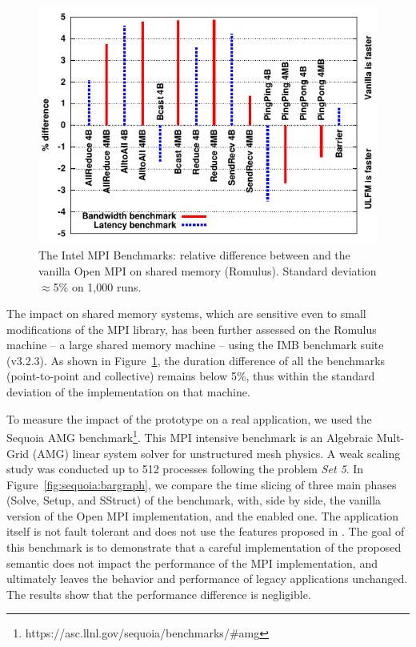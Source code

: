 \begin{figure}[ht]
\begin{center}%
 \includegraphics[width=.7\linewidth]{figures/IMB.pdf}%
 \caption{The Intel MPI Benchmarks: relative difference
   between \ulfm and the vanilla Open MPI on shared memory
  (Romulus). Standard deviation $\approx$5\% on 1,000 runs.\label{fig:IMB}}%
\end{center}
\end{figure}

The impact on shared memory systems, which are sensitive even to small
modifications of the MPI library, has been further assessed on the
Romulus machine -- a large shared memory machine -- using the IMB
benchmark suite (v3.2.3). As shown in Figure~\ref{fig:IMB}, the duration
difference of all the benchmarks (point-to-point and collective) remains
below 5\%, thus within the standard deviation of the implementation on
that machine.

To measure the impact of the prototype on a real application, we used the
Sequoia AMG benchmark\footnote{https://asc.llnl.gov/sequoia/benchmarks/\#amg}.
This MPI intensive benchmark is an Algebraic Mult-Grid (AMG) linear system
solver for unstructured mesh physics. A weak scaling study was conducted up to
512 processes following the problem \emph{Set 5}. In
Figure~\ref{fig:sequoia:bargraph}, we compare the time slicing of three main
phases (Solve, Setup, and SStruct) of the benchmark, with, side by side, the
vanilla version of the Open MPI implementation, and the \ulfm enabled one. The
application itself is not fault tolerant and does not use the features proposed
in \ulfm. The goal of this benchmark is to demonstrate that a careful
implementation of the proposed semantic does not impact the performance of the
MPI implementation, and ultimately leaves the behavior and performance
of legacy applications unchanged. The results show that the performance 
difference is negligible.


